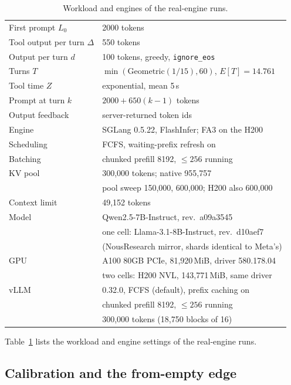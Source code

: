 \begin{table}[htbp]
\centering\footnotesize
\caption{Workload and engines of the real-engine runs.}\label{tab:workload}
\begin{tabular}{@{}l l@{}}
\toprule
First prompt $L_0$ & 2000 tokens\\
Tool output per turn $\Delta$ & 550 tokens\\
Output per turn $d$ & 100 tokens, greedy, \texttt{ignore\_eos}\\
Turns $T$ & $\min(\mathrm{Geometric}(1/15),60)$, $E[T]=14.761$\\
Tool time $Z$ & exponential, mean 5\,s\\
Prompt at turn $k$ & $2000+650(k-1)$ tokens\\
Output feedback & server-returned token ids\\
\midrule
Engine & SGLang 0.5.22, FlashInfer; FA3 on the H200\\
Scheduling & FCFS, waiting-prefix refresh on\\
Batching & chunked prefill 8192, $\le256$ running\\
KV pool & 300,000 tokens; native 955,757\\
 & pool sweep 150,000, 600,000; H200 also 600,000\\
Context limit & 49,152 tokens\\
Model & Qwen2.5-7B-Instruct, rev.\ a09a3545\\
 & one cell: Llama-3.1-8B-Instruct, rev.\ d10aef7\\
 & (NousResearch mirror, shards identical to Meta's)\\
GPU & A100 80GB PCIe, 81,920\,MiB, driver 580.178.04\\
 & two cells: H200 NVL, 143,771\,MiB, same driver\\
\midrule
vLLM & 0.32.0, FCFS (default), prefix caching on\\
 & chunked prefill 8192, $\le256$ running\\
 & 300,000 tokens (18,750 blocks of 16)\\
\bottomrule
\end{tabular}
\end{table}

Table~\ref{tab:workload} lists the workload and engine settings of the real-engine runs.

\subsection{Calibration and the from-empty edge}\label{app:calib}

